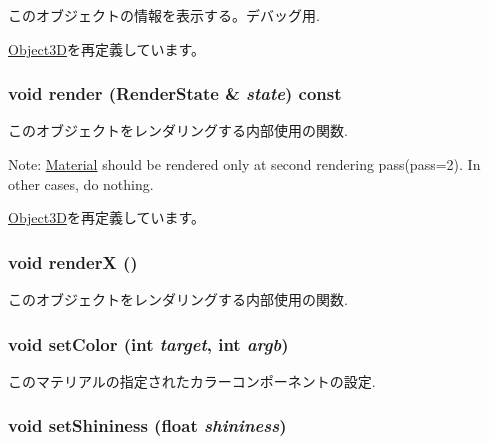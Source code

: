 このオブジェクトの情報を表示する。デバッグ用. 

\hyperlink{classm3g_1_1Object3D_6fea17fa1532df3794f8cb39cb4f911f}{Object3D}を再定義しています。\hypertarget{classm3g_1_1Material_8babc8a79b78615da51161e94029eea9}{
\subsubsection[{render}]{\setlength{\rightskip}{0pt plus 5cm}void render ({\bf RenderState} \& {\em state}) const}}
\label{classm3g_1_1Material_8babc8a79b78615da51161e94029eea9}


このオブジェクトをレンダリングする内部使用の関数.

Note: \hyperlink{classm3g_1_1Material}{Material} should be rendered only at second rendering pass(pass=2). In other cases, do nothing. 

\hyperlink{classm3g_1_1Object3D_8babc8a79b78615da51161e94029eea9}{Object3D}を再定義しています。\hypertarget{classm3g_1_1Material_443a7a301f77f625335ecc06d13bad06}{
\subsubsection[{renderX}]{\setlength{\rightskip}{0pt plus 5cm}void renderX ()}}
\label{classm3g_1_1Material_443a7a301f77f625335ecc06d13bad06}


このオブジェクトをレンダリングする内部使用の関数. \hypertarget{classm3g_1_1Material_5947a525a18bca77aa890971df2ae48a}{
\subsubsection[{setColor}]{\setlength{\rightskip}{0pt plus 5cm}void setColor (int {\em target}, \/  int {\em argb})}}
\label{classm3g_1_1Material_5947a525a18bca77aa890971df2ae48a}


このマテリアルの指定されたカラーコンポーネントの設定. \hypertarget{classm3g_1_1Material_fb630e98bef48acb3b3c0541ed3615be}{
\subsubsection[{setShininess}]{\setlength{\rightskip}{0pt plus 5cm}void setShininess (float {\em shininess})}}
\label{classm3g_1_1Material_fb630e98bef48acb3b3c0541ed3615be}


